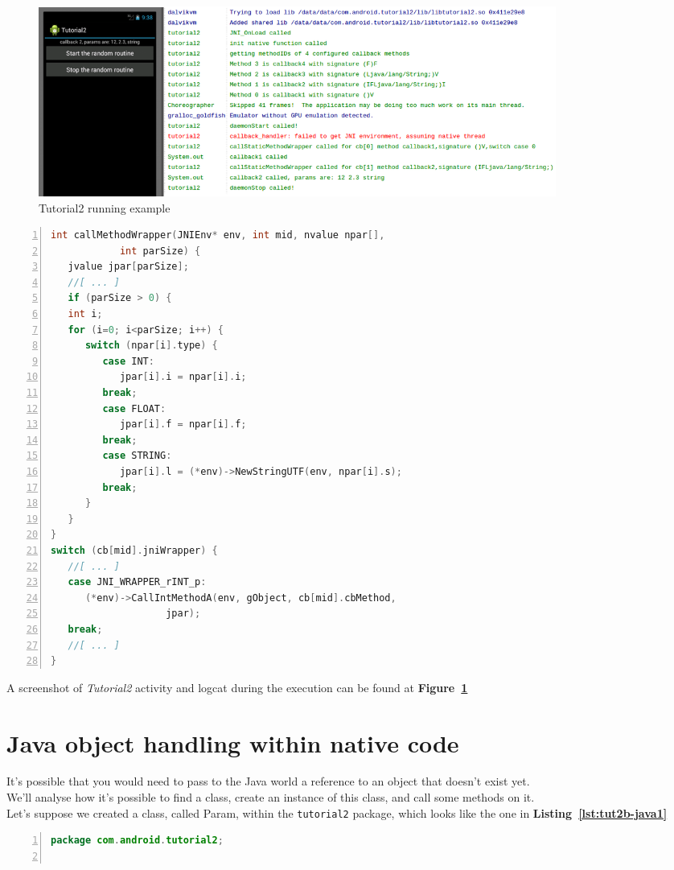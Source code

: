 \documentclass[a4paper,10pt]{article}
\newcommand{\keyword}[1]{\texttt{#1}}
\newcommand{\reff}[1]{\textbf{Figure~\ref{#1}}}
\newcommand{\refl}[1]{\textbf{Listing~\ref{#1}}}
\begin{document}
\begin{multicols}{2}
\begin{figure}[b]
 \includegraphics[width=17cm]{./figures/tut2-scr1.png}
 \caption{Tutorial2 running example}
 \label{fig:tut2-scr1}
\end{figure}
\begin{lstlisting}[language=C,
				   columns=fullflexible,
				   showstringspaces=false,
				   xleftmargin=15pt,
				   frame = l,
				   numbers=left,
				   commentstyle=\color{gray}\upshape,
				   caption=Part of tutorial2.c - callingMethodWrapper,
				   label=lst:tut2-c5]
int callMethodWrapper(JNIEnv* env, int mid, nvalue npar[],
			int parSize) {
   jvalue jpar[parSize];
   //[ ... ]
   if (parSize > 0) {
   int i;
   for (i=0; i<parSize; i++) {
      switch (npar[i].type) {
         case INT:
            jpar[i].i = npar[i].i;
         break;
         case FLOAT:
            jpar[i].f = npar[i].f;
         break;
         case STRING:
            jpar[i].l = (*env)->NewStringUTF(env, npar[i].s);
         break;
      }
   }
}
switch (cb[mid].jniWrapper) {
   //[ ... ]
   case JNI_WRAPPER_rINT_p:
      (*env)->CallIntMethodA(env, gObject, cb[mid].cbMethod,
      				jpar);
   break;
   //[ ... ]
}
\end{lstlisting}
A screenshot of \textit{Tutorial2} activity and logcat during the execution can be found at \reff{fig:tut2-scr1}


\section{Java object handling within native code}
It's possible that you would need to pass to the Java world a reference to an object that doesn't exist yet.\\
We'll analyse how it's possible to find a class, create an instance of this class, and call some methods on it.\\
Let's suppose we created a class, called Param, within the \keyword{tutorial2} package, which looks like the one in \refl{lst:tut2b-java1}
\begin{lstlisting}[language=Java,
				   columns=fullflexible,
				   showstringspaces=false,
				   xleftmargin=15pt,
				   frame = l,
				   numbers=left,
				   commentstyle=\color{gray}\upshape,
				   caption=Java class Param,
				   label=lst:tut2b-java1]
package com.android.tutorial2;


\end{lstlisting}
\end{multicols}
\end{document}
